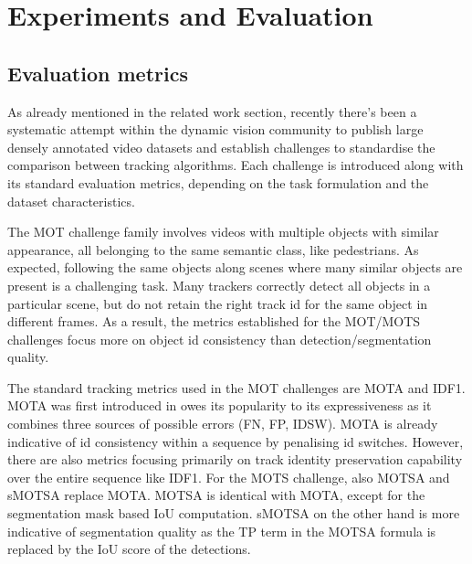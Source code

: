 \chapter{Experiments and Evaluation}\label{chapter:EvalMetrics}




\section{Evaluation metrics}
As already mentioned in the related work section, recently there's been a systematic attempt within the dynamic vision community to publish large densely annotated video datasets and establish challenges to standardise the comparison between tracking algorithms. Each challenge is introduced along with its standard evaluation metrics, depending on the task formulation and the dataset characteristics.\par

The MOT challenge family involves videos with multiple objects with similar appearance, all belonging to the same semantic class, like pedestrians. 
As expected, following the same objects along scenes where many similar objects are present is a challenging task. Many trackers correctly detect all objects in a particular scene, but do not retain the right track id for the same object in different frames. As a result, the metrics established for the MOT/MOTS challenges focus more on object id consistency than detection/segmentation quality. \par

The standard tracking metrics used in the MOT challenges are MOTA and IDF1. 
MOTA was first introduced in \parencite{MOTAmetric}
owes its popularity to its expressiveness as it combines three sources of possible errors (FN, FP, IDSW). MOTA is already indicative of id consistency within a sequence by penalising id switches. However, there are also metrics focusing primarily on track identity preservation capability over the entire sequence like IDF1. 
For the MOTS challenge, also MOTSA and sMOTSA replace MOTA. MOTSA is identical with MOTA, except for the segmentation mask based IoU computation. sMOTSA on the other hand is more indicative of segmentation quality as the TP term in the MOTSA formula is replaced by the IoU score of the detections.\par

